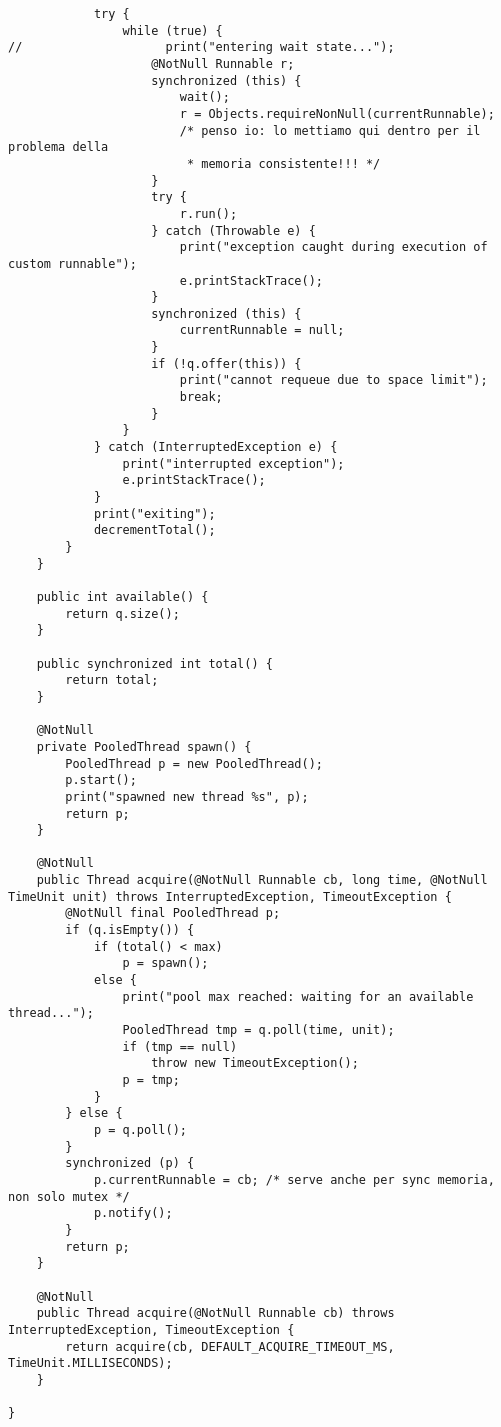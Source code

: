 \begin{lstlisting}
            try {
                while (true) {
//                    print("entering wait state...");
                    @NotNull Runnable r;
                    synchronized (this) {
                        wait();
                        r = Objects.requireNonNull(currentRunnable);
						/* penso io: lo mettiamo qui dentro per il problema della
						 * memoria consistente!!! */
                    }
                    try {
                        r.run();
                    } catch (Throwable e) {
                        print("exception caught during execution of custom runnable");
                        e.printStackTrace();
                    }
                    synchronized (this) {
                        currentRunnable = null;
                    }
                    if (!q.offer(this)) {
                        print("cannot requeue due to space limit");
                        break;
                    }
                }
            } catch (InterruptedException e) {
                print("interrupted exception");
                e.printStackTrace();
            }
            print("exiting");
            decrementTotal();
        }
    }

    public int available() {
        return q.size();
    }

    public synchronized int total() {
        return total;
    }

    @NotNull
    private PooledThread spawn() {
        PooledThread p = new PooledThread();
        p.start();
        print("spawned new thread %s", p);
        return p;
    }

    @NotNull
    public Thread acquire(@NotNull Runnable cb, long time, @NotNull TimeUnit unit) throws InterruptedException, TimeoutException {
        @NotNull final PooledThread p;
        if (q.isEmpty()) {
            if (total() < max)
                p = spawn();
            else {
                print("pool max reached: waiting for an available thread...");
                PooledThread tmp = q.poll(time, unit);
                if (tmp == null)
                    throw new TimeoutException();
                p = tmp;
            }
        } else {
            p = q.poll();
        }
        synchronized (p) {
            p.currentRunnable = cb; /* serve anche per sync memoria, non solo mutex */
            p.notify();
        }
        return p;
    }

    @NotNull
    public Thread acquire(@NotNull Runnable cb) throws InterruptedException, TimeoutException {
        return acquire(cb, DEFAULT_ACQUIRE_TIMEOUT_MS, TimeUnit.MILLISECONDS);
    }

}


\end{lstlisting}
 
